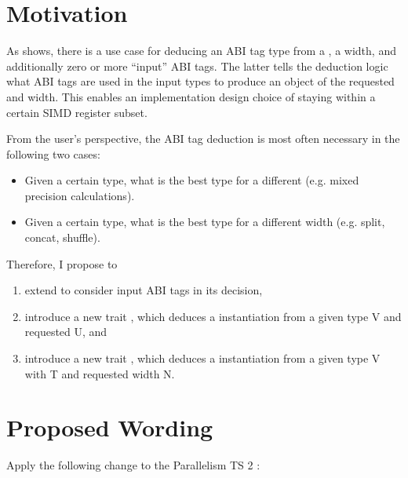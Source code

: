 \section{Motivation}
As \textcite{P0820R1} shows, there is a use case for deducing an ABI tag type from a , a width, and additionally zero or more “input” ABI tags.
The latter tells the deduction logic what ABI tags are used in the input types to produce an object of the requested  and width.
This enables an implementation design choice of staying within a certain SIMD register subset.

From the user's perspective, the ABI tag deduction is most often necessary in the following two cases:
\begin{itemize}
  \item Given a certain  type, what is the best  type for a different  (e.g. mixed precision calculations).
  \item Given a certain  type, what is the best  type for a different width (e.g. split, concat, shuffle).
\end{itemize}
Therefore, I propose to
\begin{enumerate}
  \item extend  to consider input ABI tags in its decision,
  \item introduce a new trait , which deduces a \simd[<U, Abi>] instantiation from a given \simd type \type V and requested  \type U, and
  \item introduce a new trait , which deduces a \simd[<T, Abi>] instantiation from a given \simd type \type V with  \type T and requested width \code N.
\end{enumerate}

\section{Proposed Wording}

Apply the following change to the Parallelism TS 2 \cite{N4744}:
\begin{wgText}
  \begingroup
    \ttfamily\smaller[1]
    \\
    \\
    \\
    \\
  \endgroup
\end{wgText}

